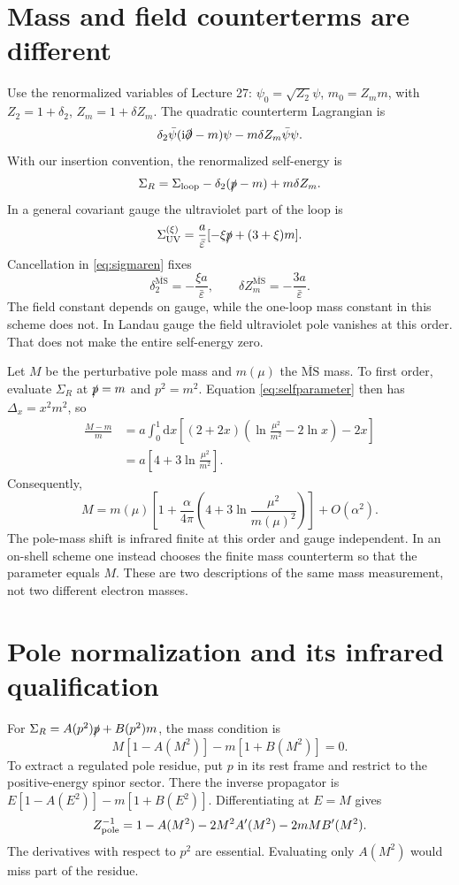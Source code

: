 \documentclass[11pt]{article}
\newcommand{\dd}{\mathrm d}
\newcommand{\ii}{\mathrm i}
\newcommand{\eps}{\varepsilon}
\newcommand{\MSbar}{\overline{\mathrm{MS}}}
\newcommand{\module}[1]{\clearpage\section{#1}}
\begin{document}
\module{Mass and field counterterms are different}
Use the renormalized variables of Lecture 27:
\(\psi_0=\sqrt{Z_2}\psi\), \(m_0=Z_m m\), with
\(Z_2=1+\delta_2\), \(Z_m=1+\delta Z_m\).
The quadratic counterterm Lagrangian is
\begin{equation}
 \delta_2\bar\psi(\ii\slashed\partial-m)\psi
 -m\delta Z_m\bar\psi\psi.
\end{equation}
With our insertion convention, the renormalized self-energy is
\begin{equation}
 \Sigma_R=\Sigma_{\rm loop}-\delta_2(\slashed p-m)+m\delta Z_m.
 \label{eq:sigmaren}
\end{equation}
In a general covariant gauge the ultraviolet part of the loop is
\begin{equation}
 \Sigma_{\rm UV}^{(\xi)}
 =\frac{a}{\bar\eps}[-\xi\slashed p+(3+\xi)m].
\end{equation}
Cancellation in \eqref{eq:sigmaren} fixes
\begin{equation}
 \delta_2^{\MSbar}=-\frac{\xi a}{\bar\eps},\qquad
 \delta Z_m^{\MSbar}=-\frac{3a}{\bar\eps}.
 \label{eq:electronct}
\end{equation}
The field constant depends on gauge, while the one-loop mass constant
in this scheme does not. In Landau gauge the field ultraviolet pole
vanishes at this order. That does not make the entire self-energy zero.

Let \(M\) be the perturbative pole mass and \(m(\mu)\) the \(\MSbar\)
mass. To first order, evaluate \(\Sigma_R\) at \(\slashed p=m\) and
\(p^2=m^2\). Equation \eqref{eq:selfparameter} then has
\(\Delta_x=x^2m^2\), so
\begin{align}
 \frac{M-m}{m}
 &=a\int_0^1\dd x\left[
 (2+2x)\left(\ln\frac{\mu^2}{m^2}-2\ln x\right)-2x\right]
 \nonumber\\
 &=a\left[4+3\ln\frac{\mu^2}{m^2}\right].
\end{align}
Consequently,
\begin{equation}
 \boxed{M=m(\mu)\left[1+\frac{\alpha}{4\pi}
 \left(4+3\ln\frac{\mu^2}{m(\mu)^2}\right)\right]+O(\alpha^2).}
\end{equation}
The pole-mass shift is infrared finite at this order and gauge independent.
In an on-shell scheme one instead chooses the finite mass counterterm so
that the parameter equals \(M\). These are two descriptions of the same
mass measurement, not two different electron masses.

\module{Pole normalization and its infrared qualification}
For \(\Sigma_R=A(p^2)\slashed p+B(p^2)m\), the mass condition is
\begin{equation}
 M[1-A(M^2)]-m[1+B(M^2)]=0.
\end{equation}
To extract a regulated pole residue, put \(p\) in its rest frame and
restrict to the positive-energy spinor sector. There the inverse
propagator is \(E[1-A(E^2)]-m[1+B(E^2)]\). Differentiating at \(E=M\)
gives
\begin{equation}
 Z_{\rm pole}^{-1}=1-A(M^2)-2M^2A'(M^2)-2mM B'(M^2).
 \label{eq:residue}
\end{equation}
The derivatives with respect to \(p^2\) are essential. Evaluating only
\(A(M^2)\) would miss part of the residue.
\end{document}
